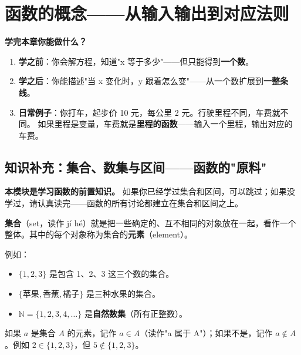 
\chapter{函数的概念——从输入输出到对应法则}

\begin{applicationbox}
\textbf{学完本章你能做什么？}
\begin{enumerate}
  \item \textbf{学之前}：你会解方程，知道"x 等于多少"——但只能得到\textbf{一个数}。
  \item \textbf{学之后}：你能描述"当 x 变化时，y 跟着怎么变"——从一个数扩展到\textbf{一整条线}。
  \item \textbf{日常例子}：你打车，起步价 10 元，每公里 2 元。行驶里程不同，车费就不同。
        如果里程是变量，车费就是\textbf{里程的函数}——输入一个里程，输出对应的车费。
\end{enumerate}
\end{applicationbox}


\section*{知识补充：集合、数集与区间——函数的"原料"}

\textbf{本模块是学习函数的前置知识。} 如果你已经学过集合和区间，可以跳过；如果没学过，请认真读完——函数的所有讨论都建立在集合和区间之上。

\begin{definitionbox}[集合]
\textbf{集合}（set，读作 jí hé）就是把一些确定的、互不相同的对象放在一起，看作一个整体。其中的每个对象称为集合的\textbf{元素}（element）。

例如：
\begin{itemize}
  \item $\{1, 2, 3\}$ 是包含 1、2、3 这三个数的集合。
  \item $\{\text{苹果}, \text{香蕉}, \text{橘子}\}$ 是三种水果的集合。
  \item $\mathbb{N} = \{1, 2, 3, 4, \ldots\}$ 是\textbf{自然数集}（所有正整数）。
\end{itemize}

如果 $a$ 是集合 $A$ 的元素，记作 $a \in A$（读作"a 属于 A"）；如果不是，记作 $a \notin A$。例如 $2 \in \{1,2,3\}$，但 $5 \notin \{1,2,3\}$。
\end{definitionbox}

